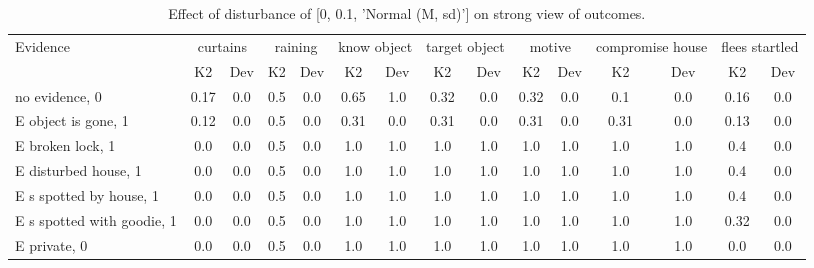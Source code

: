 \begin{table}\begin{tabular}{l|cc|cc|cc|cc|cc|cc|cc}\toprule\multirow{2}{*}{Evidence} & \multicolumn{2}{c}{curtains}& \multicolumn{2}{c}{raining}& \multicolumn{2}{c}{know object}& \multicolumn{2}{c}{target object}& \multicolumn{2}{c}{motive}& \multicolumn{2}{c}{compromise house}& \multicolumn{2}{c}{flees startled}\\& {K2} & {Dev}& {K2} & {Dev}& {K2} & {Dev}& {K2} & {Dev}& {K2} & {Dev}& {K2} & {Dev}& {K2} & {Dev}\\\midrule
no evidence, 0 & \cellcolor{Bittersweet}0.17&\cellcolor{Bittersweet}0.0&0.5&0.0&\cellcolor{Bittersweet}0.65&\cellcolor{Bittersweet}1.0&\cellcolor{Bittersweet}0.32&\cellcolor{Bittersweet}0.0&\cellcolor{Bittersweet}0.32&\cellcolor{Bittersweet}0.0&\cellcolor{Bittersweet}0.1&\cellcolor{Bittersweet}0.0&\cellcolor{Bittersweet}0.16&\cellcolor{Bittersweet}0.0\\E object is gone, 1 & \cellcolor{Bittersweet}0.12&\cellcolor{Bittersweet}0.0&0.5&0.0&\cellcolor{Bittersweet}0.31&\cellcolor{Bittersweet}0.0&\cellcolor{Bittersweet}0.31&\cellcolor{Bittersweet}0.0&\cellcolor{Bittersweet}0.31&\cellcolor{Bittersweet}0.0&\cellcolor{Bittersweet}0.31&\cellcolor{Bittersweet}0.0&\cellcolor{Bittersweet}0.13&\cellcolor{Bittersweet}0.0\\E broken lock, 1 & \cellcolor{Bittersweet}0.0&\cellcolor{Bittersweet}0.0&0.5&0.0&\cellcolor{Bittersweet}1.0&\cellcolor{Bittersweet}1.0&\cellcolor{Bittersweet}1.0&\cellcolor{Bittersweet}1.0&\cellcolor{Bittersweet}1.0&\cellcolor{Bittersweet}1.0&\cellcolor{Bittersweet}1.0&\cellcolor{Bittersweet}1.0&0.4&0.0\\E disturbed house, 1 & \cellcolor{Bittersweet}0.0&\cellcolor{Bittersweet}0.0&0.5&0.0&\cellcolor{Bittersweet}1.0&\cellcolor{Bittersweet}1.0&\cellcolor{Bittersweet}1.0&\cellcolor{Bittersweet}1.0&\cellcolor{Bittersweet}1.0&\cellcolor{Bittersweet}1.0&\cellcolor{Bittersweet}1.0&\cellcolor{Bittersweet}1.0&0.4&0.0\\E s spotted by house, 1 & \cellcolor{Bittersweet}0.0&\cellcolor{Bittersweet}0.0&0.5&0.0&\cellcolor{Bittersweet}1.0&\cellcolor{Bittersweet}1.0&\cellcolor{Bittersweet}1.0&\cellcolor{Bittersweet}1.0&\cellcolor{Bittersweet}1.0&\cellcolor{Bittersweet}1.0&\cellcolor{Bittersweet}1.0&\cellcolor{Bittersweet}1.0&0.4&0.0\\E s spotted with goodie, 1 & \cellcolor{Bittersweet}0.0&\cellcolor{Bittersweet}0.0&0.5&0.0&\cellcolor{Bittersweet}1.0&\cellcolor{Bittersweet}1.0&\cellcolor{Bittersweet}1.0&\cellcolor{Bittersweet}1.0&\cellcolor{Bittersweet}1.0&\cellcolor{Bittersweet}1.0&\cellcolor{Bittersweet}1.0&\cellcolor{Bittersweet}1.0&\cellcolor{Bittersweet}0.32&\cellcolor{Bittersweet}0.0\\E private, 0 & \cellcolor{Bittersweet}0.0&\cellcolor{Bittersweet}0.0&0.5&0.0&\cellcolor{Bittersweet}1.0&\cellcolor{Bittersweet}1.0&\cellcolor{Bittersweet}1.0&\cellcolor{Bittersweet}1.0&\cellcolor{Bittersweet}1.0&\cellcolor{Bittersweet}1.0&\cellcolor{Bittersweet}1.0&\cellcolor{Bittersweet}1.0&\cellcolor{Bittersweet}0.0&\cellcolor{Bittersweet}0.0\\\bottomrule\end{tabular}\caption{Effect of disturbance of [0, 0.1, 'Normal (M, sd)'] on strong view of outcomes.}\end{table}
